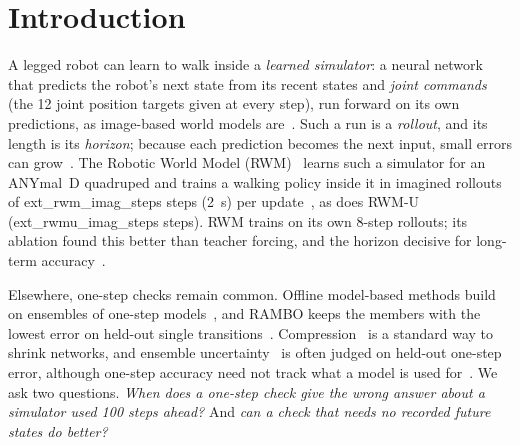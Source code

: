 \section{Introduction}\label{sec:intro}
A legged robot can learn to walk inside a \emph{learned simulator}: a neural network that predicts the robot's next
state from its recent states and \emph{joint commands} (the 12 joint position targets given at every step), run
forward on its own predictions, as image-based world models are~\cite{hafner2025}. Such a run is a \emph{rollout},
and its length is its \emph{horizon}; because each prediction becomes the next input, small errors can
grow~\cite{venkatraman2015,talvitie2017,lambert2022compounding,janner2019}. The Robotic World Model
(RWM)~\cite{li2025rwm} learns such a simulator for an ANYmal~D quadruped and trains a walking policy inside it in imagined rollouts of
{{ext_rwm_imag_steps}} steps (2~s) per update~\cite[Table~S11]{li2025rwm}, as does RWM-U~\cite{li2025rwmu}
({{ext_rwmu_imag_steps}} steps). RWM trains on its own 8-step
rollouts; its ablation found this better than teacher forcing, and the horizon decisive for long-term
accuracy~\cite[Sec.~4.3, App.~A.4.1]{li2025rwm}.

Elsewhere, one-step checks remain common. Offline model-based methods build on ensembles of one-step
models~\cite{yu2020mopo,yu2021combo}, and RAMBO keeps the members with the lowest error on held-out single
transitions~\cite{rigter2022rambo}. Compression~\cite{han2016} is a standard way to shrink networks, and ensemble uncertainty~\cite{chua2018,yu2020mopo}
is often judged on held-out one-step error, although one-step accuracy need not track what a model is used
for~\cite{lambert2020objective}. We ask two questions. \emph{When does a one-step check give the wrong answer about a
simulator used 100 steps ahead?} And \emph{can a check that needs no recorded future states do better?}

